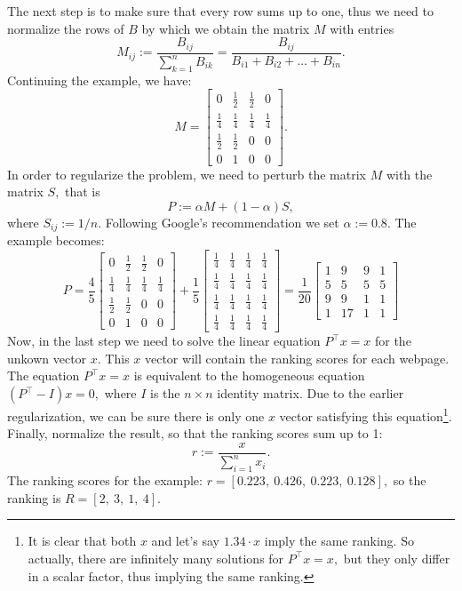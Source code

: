 \documentclass[a4paper, fleqn, 10pt]{report}
\theoremstyle{definition}
\begin{document}
The next step is to make sure that every row sums up to one, thus we need to normalize the rows of $B$
by which we obtain the matrix $M$ with entries
\[M_{ij} := \frac{B_{ij}}{\sum_{k=1}^n B_{ik}} = \frac{B_{ij}}{B_{i1} + B_{i2} + \dots + B_{in}}.\]
Continuing the example, we have:
\[
M = 
\begin{bmatrix}
0 & \frac{1}{2} & \frac{1}{2} & 0\\
\frac{1}{4} & \frac{1}{4} & \frac{1}{4} & \frac{1}{4}\\
\frac{1}{2} & \frac{1}{2} & 0 & 0\\
0 & 1 & 0 & 0
\end{bmatrix}.
\]
In order to regularize the problem, we need to perturb the matrix $M$ with the matrix $S,$
that is \[P:=\alpha M + (1-\alpha)S,\]
where  $S_{ij} := 1/n.$
Following Google's recommendation we set $\alpha := 0.8.$ The example becomes:
\[P = \frac{4}{5}\begin{bmatrix}
0 & \frac{1}{2} & \frac{1}{2} & 0\\
\frac{1}{4} & \frac{1}{4} & \frac{1}{4} & \frac{1}{4}\\
\frac{1}{2} & \frac{1}{2} & 0 & 0\\
0 & 1 & 0 & 0
\end{bmatrix} + \frac{1}{5} 
\begin{bmatrix}
\frac{1}{4} & \frac{1}{4} & \frac{1}{4} & \frac{1}{4}\\
\frac{1}{4} & \frac{1}{4} & \frac{1}{4} & \frac{1}{4}\\
\frac{1}{4} & \frac{1}{4} & \frac{1}{4} & \frac{1}{4}\\
\frac{1}{4} & \frac{1}{4} & \frac{1}{4} & \frac{1}{4}
\end{bmatrix}=
\frac{1}{20}
\begin{bmatrix}
1 & 9 & 9 & 1\\
5 & 5 & 5 & 5\\
9 & 9 & 1 & 1\\
1 & 17 & 1 & 1
\end{bmatrix}
\]
Now, in the last step we need to solve the linear equation $P^\top x=x$ for the unkown vector $x.$
This $x$ vector will contain the ranking scores for each webpage.
The equation $P^\top x=x$ is equivalent to the homogeneous equation $(P^\top-I)x=0,$
where $I$ is the $n\times n$ identity matrix.
Due to the earlier regularization, we can be sure there is only one
$x$ vector satisfying this equation\footnote{It is clear that both $x$ and let's say $1.34\cdot x$
imply the same ranking.
So actually, there are infinitely many solutions for $P^\top x = x,$
but they only differ in a scalar factor, thus implying the same ranking.}.
Finally, normalize the result, so that the ranking scores sum up to 1:
\[r := \frac{x}{\sum_{i=1}^n x_i}.\]
The ranking scores for the example: $r = [0.223,\: 0.426,\: 0.223,\: 0.128],$
so the ranking is $R = [2,\: 3,\: 1,\: 4].$
\end{document}
